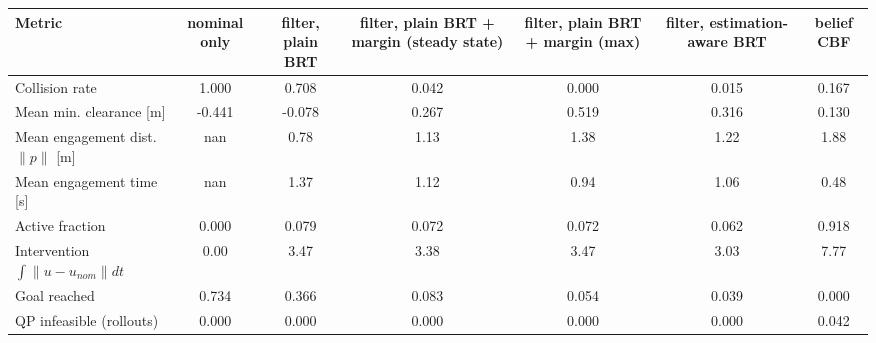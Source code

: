 \begin{tabular}{lcccccc}
\toprule
Metric & nominal only & filter, plain BRT & filter, plain BRT + margin (steady state) & filter, plain BRT + margin (max) & filter, estimation-aware BRT & belief CBF \\
\midrule
Collision rate & 1.000 & 0.708 & 0.042 & 0.000 & 0.015 & 0.167 \\
Mean min. clearance [m] & -0.441 & -0.078 & 0.267 & 0.519 & 0.316 & 0.130 \\
Mean engagement dist. $\|p\|$ [m] & nan & 0.78 & 1.13 & 1.38 & 1.22 & 1.88 \\
Mean engagement time [s] & nan & 1.37 & 1.12 & 0.94 & 1.06 & 0.48 \\
Active fraction & 0.000 & 0.079 & 0.072 & 0.072 & 0.062 & 0.918 \\
Intervention $\int\|u-u_{nom}\|dt$ & 0.00 & 3.47 & 3.38 & 3.47 & 3.03 & 7.77 \\
Goal reached & 0.734 & 0.366 & 0.083 & 0.054 & 0.039 & 0.000 \\
QP infeasible (rollouts) & 0.000 & 0.000 & 0.000 & 0.000 & 0.000 & 0.042 \\
\bottomrule
\end{tabular}